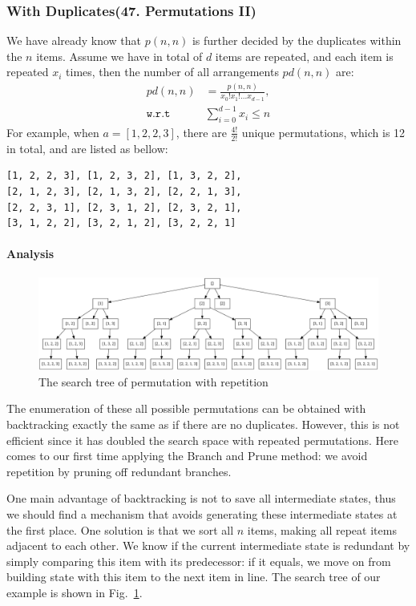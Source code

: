 \documentclass[../main.tex]{subfiles}
\begin{document}
\subsubsection{With Duplicates(47. Permutations II)}
We have already know that $p(n, n)$ is further decided by the duplicates within the $n$ items. Assume we have in total of $d$ items are repeated, and each item is repeated $x_i$ times, then the number of all arrangements $pd(n, n)$ are:
\begin{align}
    pd(n, n) &= \frac{p(n, n)}{x_0!x_1!...x_{d-1}}, \\
    \texttt{w.r.t } & \sum_{i=0}^{d-1} x_i \leq n
\end{align}
For example, when $a = [1, 2, 2, 3]$, there are $\frac{4!}{2!}$ unique permutations, which is 12 in total, and are listed as bellow:
\begin{lstlisting}[numbers=none]
[1, 2, 2, 3], [1, 2, 3, 2], [1, 3, 2, 2],
[2, 1, 2, 3], [2, 1, 3, 2], [2, 2, 1, 3],
[2, 2, 3, 1], [2, 3, 1, 2], [2, 3, 2, 1],
[3, 1, 2, 2], [3, 2, 1, 2], [3, 2, 2, 1]
\end{lstlisting}
\paragraph{Analysis} 
\begin{figure}[h]
    \centering
    \includegraphics[width= 1.2\columnwidth]{fig/permutation_repeat.png}
    \caption{The search tree of permutation with repetition}
    \label{fig:backtrack_permutation_duplicates}
\end{figure}
The enumeration of these all possible permutations can be obtained with backtracking exactly the same as if there are no duplicates. However, this is not efficient since it has doubled the search space with repeated permutations. Here comes to our first time applying the Branch and Prune method:  we avoid repetition by pruning off redundant branches. 

One main advantage of backtracking is not to save all intermediate states, thus we should find a mechanism that avoids generating these intermediate states at the first place.  One solution is that we sort all $n$ items, making all repeat items adjacent to each other. We know if the current intermediate state is redundant by simply comparing this item with its predecessor: if it equals, we move on from building state with this item to the next item in line. The search tree of our example is shown in Fig.~\ref{fig:backtrack_permutation_duplicates}. 
\end{document}
